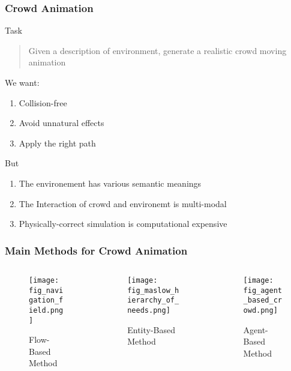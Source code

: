 \begin{frame}
    \frametitle{Crowd Animation}
    Task
    \begin{quote}
        Given a description of environment, generate a realistic crowd moving animation 
    \end{quote}
    We want:
    \begin{enumerate}
        \item Collision-free 
        \item Avoid unnatural effects
        \item Apply the right path
    \end{enumerate}
    But 
    \begin{enumerate}
        \item The environement has various semantic meanings
        \item The Interaction of crowd and environemt is multi-modal
        \item Physically-correct simulation is computational expensive
    \end{enumerate}
\end{frame}


\begin{frame}
    \frametitle{Main Methods for Crowd Animation}
    \begin{columns}[c]
        \begin{column}{0.3\textwidth}
            \begin{figure}
                \texttt{[image: fig\_navigation\_field.png]}
                \caption{Flow-Based Method\cite{patilDirectingCrowdSimulations2011}}
            \end{figure}
        \end{column}
        \begin{column}{0.3\textwidth}
            \begin{figure}
                \texttt{[image: fig\_maslow\_hierarchy\_of\_needs.png]}
                \caption{Entity-Based Method}
            \end{figure}
        \end{column}
        \begin{column}{0.3\textwidth}
            \begin{figure}
                \texttt{[image: fig\_agent\_based\_crowd.png]}
                \caption{Agent-Based Method \cite{tanakaGuidanceFieldVector2016}}
            \end{figure}
        \end{column}
    \end{columns}
\end{frame}

